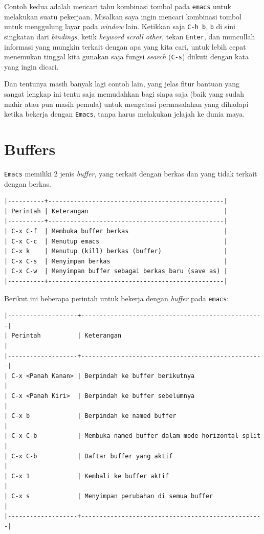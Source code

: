 \documentclass{article}
\begin{document}
Contoh kedua adalah mencari tahu kombinasi tombol pada \verb=emacs= untuk
melakukan suatu pekerjaan. Misalkan saya ingin mencari kombinasi tombol untuk
menggulung layar pada \emph{window} lain. Ketikkan saja \verb=C-h b=,
\verb=b= di sini singkatan dari \emph{bindings}, ketik 
\emph{keyword scroll other}, tekan \verb=Enter=, dan muncullah informasi
yang mungkin terkait dengan apa yang kita cari, untuk lebih cepat menemukan
tinggal kita gunakan saja fungsi \emph{search} (\verb=C-s=) diikuti dengan
kata yang ingin dicari.

Dan tentunya masih banyak lagi contoh lain, yang jelas fitur bantuan yang 
sangat lengkap ini tentu saja memudahkan bagi siapa saja (baik yang sudah
mahir atau pun masih pemula) untuk mengatasi permasalahan yang dihadapi
ketika bekerja dengan \verb=Emacs=, tanpa harus melakukan jelajah ke 
dunia maya.

\section{Buffers}
\verb=Emacs= memiliki 2 jenis \emph{buffer}, yang terkait dengan berkas dan
yang tidak terkait dengan berkas.

\begin{verbatim}
|----------+------------------------------------------------|
| Perintah | Keterangan                                     |
|----------+------------------------------------------------|
| C-x C-f  | Membuka buffer berkas                          |
| C-x C-c  | Menutup emacs                                  |
| C-x k    | Menutup (kill) berkas (buffer)                 |
| C-x C-s  | Menyimpan berkas                               |
| C-x C-w  | Menyimpan buffer sebagai berkas baru (save as) |
|----------+------------------------------------------------|
\end{verbatim}

Berikut ini beberapa perintah untuk bekerja dengan \emph{buffer} pada 
\verb=emacs=:

\begin{verbatim}
|-------------------+--------------------------------------------------|
| Perintah          | Keterangan                                       |
|-------------------+--------------------------------------------------|
| C-x <Panah Kanan> | Berpindah ke buffer berikutnya                   |
| C-x <Panah Kiri>  | Berpindah ke buffer sebelumnya                   |
| C-x b             | Berpindah ke named buffer                        |
| C-x C-b           | Membuka named buffer dalam mode horizontal split |
| C-x C-b           | Daftar buffer yang aktif                         |
| C-x 1             | Kembali ke buffer aktif                          |
| C-x s             | Menyimpan perubahan di semua buffer              |
|-------------------+--------------------------------------------------|
\end{verbatim}
\end{document}
